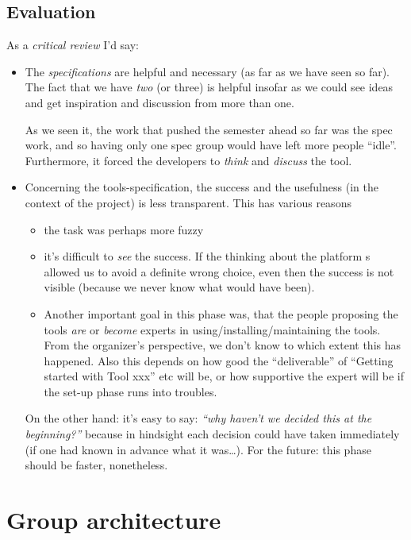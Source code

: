 \documentclass[11pt,handout,nologo]{handout}
\begin{document}
\subsection*{Evaluation}

As a \emph{critical review} I'd say:


\begin{itemize}
\item The \emph{specifications} are helpful and necessary (as far as we
  have seen so far). The fact that we have \emph{two} (or three) is helpful
  insofar as we could see ideas and get inspiration and discussion from
  more than one. 
  
  As we seen it, the work that pushed the semester ahead so far was the
  spec work, and so having only one spec group would have left more people
  ``idle''.  Furthermore, it forced the developers to \emph{think} and
  \emph{discuss} the tool.
\item Concerning the tools-specification, the success and the usefulness
  (in the context of the project) is less transparent. This has various
  reasons
  \begin{itemize}
  \item the task was perhaps more fuzzy
  \item it's difficult to \emph{see} the success. If the thinking about the
    platform s allowed us to avoid a definite wrong choice, even then the
    success is not visible (because we never know what would have been).
  \item Another important goal in this phase was, that the people proposing
    the tools \emph{are} or \emph{become} experts in
    using/installing/maintaining the tools. From the organizer's
    perspective, we don't know to which extent this has happened. Also this
    depends on how good the ``deliverable'' of ``Getting started with Tool
    xxx'' etc will be, or how supportive the expert will be if the set-up
    phase runs into troubles.
  \end{itemize}
  On the other hand: it's easy to say: \emph{``why haven't we decided this
    at the beginning?''} because in hindsight each decision could have
  taken immediately (if one had known in advance what it was\ldots). For the
  future: this phase should be faster, nonetheless.
\end{itemize}




\section*{Group architecture}
\end{document}
